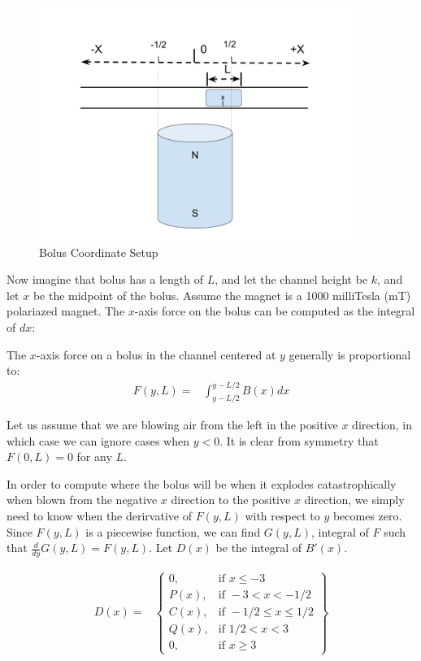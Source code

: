 \documentclass[]{asme2ej}
\begin{document}
\begin{figure}
\centerline{\includegraphics[width=4in]{figure/BolusSetup.png}}
\caption{Bolus Coordinate Setup}
\label{fig:ChannelToChamber}
\end{figure}

Now imagine that bolus has a length of $L$, and let the channel height be $k$, and let $x$ be
the midpoint of the bolus.
Assume the magnet is a 1000 milliTesla (mT) polariazed magnet.
The $x$-axis force on the bolus can be computed as the integral of $dx$:

The $x$-axis force on a bolus in the channel centered at $y$ generally is proportional to:
\begin{align}
  F(y,L) = & \int_{y-L/2}^{y-L/2} B(x) dx
\end{align}

Let us assume that we are blowing air from the left in the positive $x$ direction, in which case
we can ignore cases when $y < 0$. It is clear from symmetry that $ F(0,L) = 0 $ for any $L$.


In order to compute where the bolus will be when it explodes catastrophically when blown from
the negative $x$ direction to the positive $x$ direction, we simply need to know when the derirvative of
$F(y,L)$ with respect to $y$ becomes zero. Since $F(y,L)$ is a piecewise function, we can find $G(y,L)$,
integral of $F$ such that $\frac{d}{dy} G(y,L) = F(y,L)$. Let $D(x)$ be the integral of $B'(x)$.

\begin{align}
  D(x) =  &
\left\{
    \begin{array}{lr}
      0 , & \text{if } x \leq -3 \\
      P(x) , & \text{if } -3 < x  < -1/2 \\
      C(x) , & \text{if } -1/2 \leq x \leq 1/2 \\
      Q(x)   , & \text{if } 1/2 < x < 3 \\
      0 , & \text{if } x \geq 3
    \end{array}
    \right\}
    \label{eq:Dintegration}
\end{align}
\end{document}
